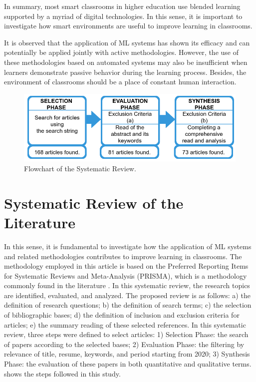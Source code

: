 \documentclass[english]{textolivre}
\begin{document}
In summary, most smart classrooms in higher education use blended
learning \cite{Chen2021} supported by a myriad of digital
technologies. In this sense, it is important to investigate how smart
environments are useful to improve learning in classrooms.


It is observed that the application of ML systems has shown its efficacy
and can potentially be applied jointly with active methodologies.
However, the use of these methodologies based on automated systems may
also be insufficient when learners demonstrate passive behavior during
the learning process. Besides, the environment of classrooms should be a
place of constant human interaction.

\begin{figure}[htbp]
\centering
\begin{minipage}{.75\textwidth}
  \includegraphics[width=\textwidth]{figure01.png}
  \caption{Flowchart of the Systematic Review.}
  \label{fig01}
\end{minipage}
\end{figure}


\section{Systematic Review of the Literature}\label{sec-review}

In this sense, it is fundamental to investigate how the application of
ML systems and related methodologies contributes to improve learning in
classrooms. The methodology employed in this article is based on the
Preferred Reporting Items for Systematic Reviews and Meta-Analysis
(PRISMA), which is a methodology commonly found in the literature
\cite{MontoyaRodriguez2023, Alfoudari2021, Shazli2023}. In this
systematic review, the research topics are identified, evaluated, and
analyzed. The proposed review is as follows: a) the definition of
research questions; b) the definition of search terms; c) the selection
of bibliographic bases; d) the definition of inclusion and exclusion
criteria for articles; e) the summary reading of these selected
references. In this systematic review, three steps were defined to
select articles: 1) Selection Phase: the search of papers according to
the selected bases; 2) Evaluation Phase: the filtering by relevance of
title, resume, keywords, and period starting from 2020; 3) Synthesis
Phase: the evaluation of these papers in both quantitative and
qualitative terms.  shows the steps followed in this study.
\end{document}
